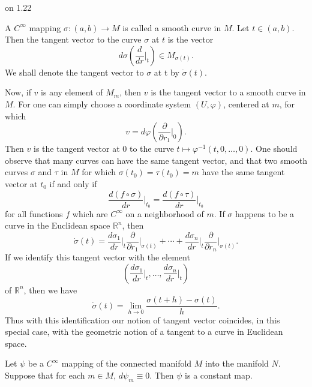 \begin{remarks}{on 1.22}
\begin{enumerate}
		 A $C^{\infty}$ mapping $\sigma: (a,b)\to M$ is called a smooth curve in $M$. Let $t\in(a,b)$. Then
		the tangent vector to the curve $\sigma$ at $t$ is the vector 
		\[
			d\sigma\left(\frac{d}{d r}\bigg|_{t}\right)\in M_{\sigma(t)}.
		\]
		We shall denote the tangent vector to  $ \sigma $ at t by  $ \dot{\sigma}(t) $.
		\begin{center}
		\end{center}
		Now, if $v$ is any element of $M_{m}$, then $v$ is the tangent vector to a smooth
		curve in $M$. For one can simply choose a coordinate system $(U,\varphi)$,
		centered at $m$, for which
		\[
			v=d\varphi\left(\frac{\partial}{\partial r_{1}}\bigg|_{0}\right).
		\]
		Then $v$ is the tangent vector at 0 to the curve $t \mapsto \varphi^{-1}(t, 0, \ldots, 0)$. One
		should observe that many curves can have the same tangent vector, and
		that two smooth curves $\sigma$ and $\tau$ in $M$ for which $\sigma(t_{0}) = \tau(t_{0}) = m$
		have the same tangent vector at $t_{0}$ if and only if
		\[
			\frac{d(f\circ\sigma)}{d r}\Big|_{t_{0}}=\frac{d(f\circ\tau)}{d r}\Big|_{t_{0}}
		\]
		for all functions $f$ which are $C^{\infty}$ on a neighborhood of $m$.
		If $\sigma$ happens to be a curve in the Euclidean space $\mathbb{R}^{n}$, then
		\[
			\dot{\sigma}(t)=\frac{d\sigma_{1}}{d r}\bigg|_{t}\frac{\partial}{\partial r_{1}}\bigg|_{\sigma(t)}+\cdots+\frac{d\sigma_{n}}{d r}\bigg|_{t}\frac{\partial}{\partial r_{n}}\bigg|_{\sigma(t)}.
		\]
		If we identify this tangent vector with the element
		\[
			\left(\frac{d\sigma_{1}}{d r}\bigg|_{t},\ldots,\frac{d\sigma_{n}}{d r}\bigg|_{t}\right)
		\]
		of $\mathbb{R}^{n}$, then we have
		\[
			\dot{\sigma}(t)=\lim_{h\to0}\frac{\sigma(t+h)-\sigma(t)}{h}.
		\]
		Thus with this identification our notion of tangent vector coincides,
		in this special case, with the geometric notion of a tangent to a curve in Euclidean space.
	\end{enumerate}

\end{remarks}

\begin{theorem}\label{thm:1.24}
	Let $\psi$ be a $C^\infty$ mapping of the connected manifold $M$ into the manifold $N$. Suppose that for
	each $m \in M$, $d\psi_m \equiv 0$. Then $\psi$ is a constant map.
\end{theorem}


